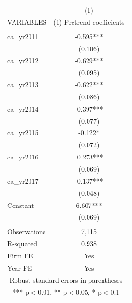 \begin{tabular}{lc} \hline
 & (1) \\
VARIABLES & (1) Pretrend coefficients \\ \hline
 &  \\
ca\_yr2011 & -0.595*** \\
 & (0.106) \\
ca\_yr2012 & -0.629*** \\
 & (0.095) \\
ca\_yr2013 & -0.622*** \\
 & (0.086) \\
ca\_yr2014 & -0.397*** \\
 & (0.077) \\
ca\_yr2015 & -0.122* \\
 & (0.072) \\
ca\_yr2016 & -0.273*** \\
 & (0.069) \\
ca\_yr2017 & -0.137*** \\
 & (0.048) \\
Constant & 6.607*** \\
 & (0.069) \\
 &  \\
Observations & 7,115 \\
R-squared & 0.938 \\
Firm FE & Yes \\
 Year FE & Yes \\ \hline
\multicolumn{2}{c}{ Robust standard errors in parentheses} \\
\multicolumn{2}{c}{ *** p$<$0.01, ** p$<$0.05, * p$<$0.1} \\
\end{tabular}
